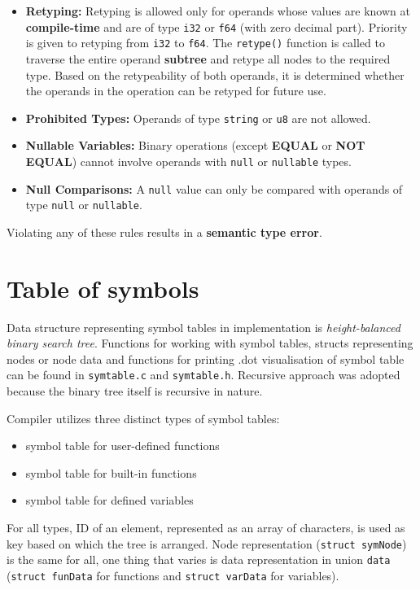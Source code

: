 \documentclass[a4paper, 11pt]{article}
\begin{document}
\begin{itemize}
    \item \textbf{Retyping:} Retyping is allowed only for operands whose values are known at \textbf{compile-time} and are of type 
        \verb|i32| or \verb|f64| (with zero decimal part). Priority is given to retyping from \verb|i32| to \verb|f64|. The 
        \verb|retype()| function is called to traverse the entire operand \textbf{subtree} and retype all nodes to the required type. 
        Based on the retypeability of both operands, it is determined whether the operands in the operation can be retyped for future use.
    \item \textbf{Prohibited Types:} Operands of type \verb|string| or \verb|u8| are not allowed.
    \item \textbf{Nullable Variables:} Binary operations (except \textbf{EQUAL} or \textbf{NOT EQUAL}) cannot involve operands with 
        \verb|null| or \verb|nullable| types.
    \item \textbf{Null Comparisons:} A \verb|null| value can only be compared with operands of type \verb|null| or \verb|nullable|.
\end{itemize}

Violating any of these rules results in a \textbf{semantic type error}.


\section{Table of symbols}\label{sec:SYMTABLE}
Data structure representing symbol tables in implementation is \textit{height-balanced binary search tree}.
Functions for working with symbol tables, structs representing nodes or node data and functions for printing
.dot visualisation of symbol table can be found in \verb|symtable.c| and \verb|symtable.h|. Recursive approach was adopted because the binary tree itself is recursive in nature.
\par
Compiler utilizes three distinct types of symbol tables: 
\begin{itemize}
    \item symbol table for user-defined functions
    \item symbol table for built-in functions
    \item symbol table for defined variables
\end{itemize}
 For all types, ID of an element, represented as
an array of characters, is used as key based on which the tree is arranged. Node representation (\verb|struct symNode|) is the same for all, one thing that varies
is data representation in union \verb|data| (\verb|struct funData| for functions and \verb|struct varData| for variables).
\end{document}
